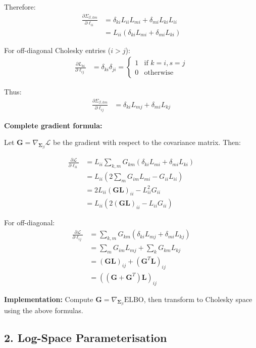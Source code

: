 \documentclass[11pt,a4paper]{article}
\newcommand{\ELBO}{\text{ELBO}}
\begin{document}
Therefore:
\begin{align}
\frac{\partial \Sigma_{\beta,km}}{\partial \ell_{ii}} &= \delta_{ki} L_{ii} L_{mi} + \delta_{mi} L_{ki} L_{ii}\\
&= L_{ii} (\delta_{ki} L_{mi} + \delta_{mi} L_{ki})
\end{align}

For off-diagonal Cholesky entries ($i > j$):
\begin{align}
\frac{\partial L_{ki}}{\partial \ell_{ij}} &= \delta_{ki} \delta_{ji} = \begin{cases}
1 & \text{if } k=i, s=j\\
0 & \text{otherwise}
\end{cases}
\end{align}

Thus:
\begin{align}
\frac{\partial \Sigma_{\beta,km}}{\partial \ell_{ij}} &= \delta_{ki} L_{mj} + \delta_{mi} L_{kj}
\end{align}

\textbf{Complete gradient formula:}

Let $\bm{G} = \nabla_{\bm{\Sigma}_\beta} \mathcal{L}$ be the gradient with respect to the covariance matrix. Then:

\begin{align}
\frac{\partial \mathcal{L}}{\partial \ell_{ii}} &= L_{ii} \sum_{k,m} G_{km} (\delta_{ki} L_{m i} + \delta_{mi} L_{ki})\\
&= L_{ii} \left(2 \sum_{m} G_{im} L_{mi} - G_{ii} L_{ii}\right)\\
&= 2 L_{ii} \left(\bm{G} \bm{L}\right)_{ii} - L_{ii}^2 G_{ii}\\
&= L_{ii} \left(2 (\bm{G} \bm{L})_{ii} - L_{ii} G_{ii}\right)
\end{align}

For off-diagonal:
\begin{align}
\frac{\partial \mathcal{L}}{\partial \ell_{ij}} &= \sum_{k,m} G_{km} (\delta_{ki} L_{mj} + \delta_{mi} L_{kj})\\
&= \sum_m G_{im} L_{mj} + \sum_k G_{km} L_{kj}\\
&= (\bm{G} \bm{L})_{ij} + (\bm{G}^T \bm{L})_{ij}\\
&= ((\bm{G} + \bm{G}^T) \bm{L})_{ij}
\end{align}

\textbf{Implementation:} Compute $\bm{G} = \nabla_{\bm{\Sigma}_\beta} \ELBO$, then transform to Cholesky space using the above formulas.

\subsection*{2. Log-Space Parameterisation}
\end{document}
